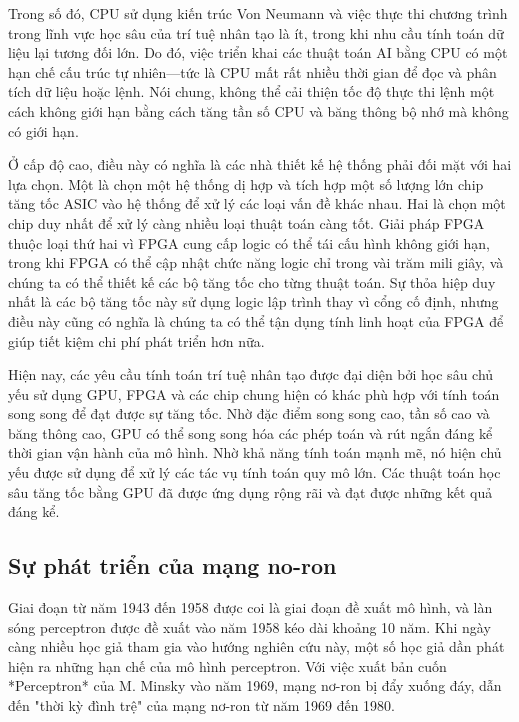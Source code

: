 \documentclass[a4paper]{article}
\begin{document}
Trong số đó, CPU sử dụng kiến trúc Von Neumann và việc thực thi chương trình trong lĩnh vực học sâu của trí tuệ nhân tạo là ít, trong khi nhu cầu tính toán dữ liệu lại tương đối lớn. Do đó, việc triển khai các thuật toán AI bằng CPU có một hạn chế cấu trúc tự nhiên—tức là CPU mất rất nhiều thời gian để đọc và phân tích dữ liệu hoặc lệnh. Nói chung, không thể cải thiện tốc độ thực thi lệnh một cách không giới hạn bằng cách tăng tần số CPU và băng thông bộ nhớ mà không có giới hạn.

Ở cấp độ cao, điều này có nghĩa là các nhà thiết kế hệ thống phải đối mặt với hai lựa chọn. Một là chọn một hệ thống dị hợp và tích hợp một số lượng lớn chip tăng tốc ASIC vào hệ thống để xử lý các loại vấn đề khác nhau. Hai là chọn một chip duy nhất để xử lý càng nhiều loại thuật toán càng tốt. Giải pháp FPGA thuộc loại thứ hai vì FPGA cung cấp logic có thể tái cấu hình không giới hạn, trong khi FPGA có thể cập nhật chức năng logic chỉ trong vài trăm mili giây, và chúng ta có thể thiết kế các bộ tăng tốc cho từng thuật toán. Sự thỏa hiệp duy nhất là các bộ tăng tốc này sử dụng logic lập trình thay vì cổng cố định, nhưng điều này cũng có nghĩa là chúng ta có thể tận dụng tính linh hoạt của FPGA để giúp tiết kiệm chi phí phát triển hơn nữa.

Hiện nay, các yêu cầu tính toán trí tuệ nhân tạo được đại diện bởi học sâu chủ yếu sử dụng GPU, FPGA và các chip chung hiện có khác phù hợp với tính toán song song để đạt được sự tăng tốc. Nhờ đặc điểm song song cao, tần số cao và băng thông cao, GPU có thể song song hóa các phép toán và rút ngắn đáng kể thời gian vận hành của mô hình. Nhờ khả năng tính toán mạnh mẽ, nó hiện chủ yếu được sử dụng để xử lý các tác vụ tính toán quy mô lớn. Các thuật toán học sâu tăng tốc bằng GPU đã được ứng dụng rộng rãi và đạt được những kết quả đáng kể.
\subsection{Sự phát triển của mạng no-ron}

Giai đoạn từ năm 1943 đến 1958 được coi là giai đoạn đề xuất mô hình, và làn sóng perceptron được đề xuất vào năm 1958 kéo dài khoảng 10 năm. Khi ngày càng nhiều học giả tham gia vào hướng nghiên cứu này, một số học giả dần phát hiện ra những hạn chế của mô hình perceptron. Với việc xuất bản cuốn *Perceptron* của M. Minsky vào năm 1969, mạng nơ-ron bị đẩy xuống đáy, dẫn đến "thời kỳ đình trệ" của mạng nơ-ron từ năm 1969 đến 1980.
 
\end{document}
